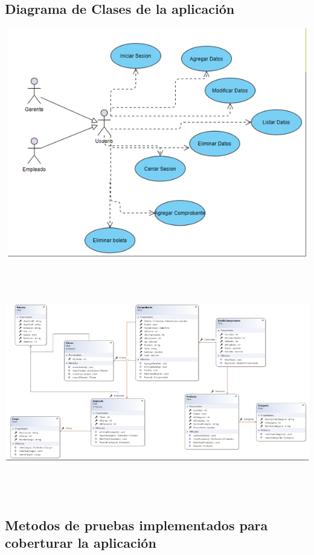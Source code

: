 \documentclass[12pt,letterpaper]{article}
\begin{document}
\subsection{Diagrama de Clases de la aplicación}
\begin{center}
    \includegraphics[width=18cm, height=10cm]{img/casos.png}  
\end{center}
\begin{center}
    \includegraphics[width=18cm, height=10cm]{img/casos2.png}  
\end{center}
\newpage
\subsection{Metodos de pruebas implementados para coberturar la aplicación}
\end{document}
